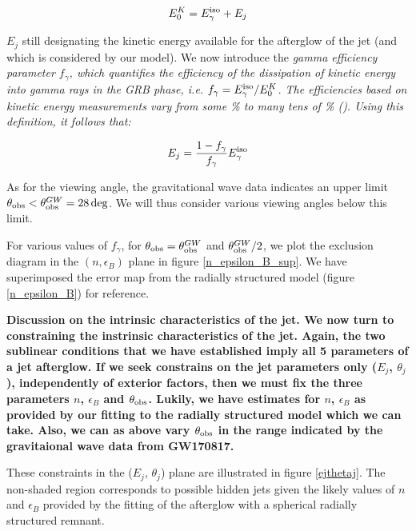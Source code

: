 $$E^K_0 = E^{\rm{iso}}_\gamma + E_j$$

$E_j$ still designating the kinetic energy available for the afterglow of the jet (and which is considered by our model). We now introduce the \it{gamma efficiency} parameter $f_\gamma$, which quantifies the efficiency of the dissipation of kinetic energy into gamma rays in the GRB phase, i.e. $f_\gamma = E^{\rm{iso}}_\gamma/E^K_0$. The efficiencies based on kinetic energy measurements vary from some \% to many tens of \% (\cite{47,48}). Using this definition, it follows that:

$$E_j = \frac{1 - f_\gamma}{f_\gamma} E^{\rm{iso}}_\gamma $$

As for the viewing angle, the gravitational wave data indicates an upper limit $\thetaobs < \thetaobs^{GW} = 28\deg$. We will thus consider various viewing angles below this limit.

For various values of $f_\gamma$, for $\thetaobs = \thetaobs^{GW}$ and $\thetaobs^{GW} / 2$, we plot the exclusion diagram in the $(n, \epsilon_B)$ plane in figure \ref{n_epsilon_B_sup}. We have superimposed the error map from the radially structured model (figure \ref{n_epsilon_B}) for reference.


\bf{Discussion on the intrinsic characteristics of the jet.} We now turn to constraining the instrinsic characteristics of the jet. Again, the two sublinear conditions that we have established imply all 5 parameters of a jet afterglow. If we seek constrains on the jet parameters only ($E_j$, $\theta_j$), independently of exterior factors, then we must fix the three parameters $n$, $\epsilon_B$ and $\thetaobs$. Lukily, we have estimates for $n$, $\epsilon_B$ as provided by our fitting to the radially structured model which we can take. Also, we can as above vary $\thetaobs$ in the range indicated by the gravitaional wave data from GW170817.

These constraints in the ($E_j$, $\theta_j$) plane are illustrated in figure \ref{ejthetaj}. The non-shaded region corresponds to possible hidden jets given the likely values of $n$ and $\epsilon_B$ provided by the fitting of the afterglow with a spherical radially structured remnant.


